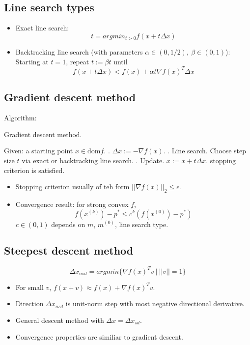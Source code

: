 \subsection{Line search types}
\begin{itemize}
    \item Exact line search: 
    $$
    t = argmin_{t > 0} f(x + t\Delta x)
    $$
    \item Backtracking line search (with parameters $\alpha \in (0, 1/2), \ \beta \in (0, 1)$): \\
    Starting at $t = 1$, repeat $t := \beta t$ until
    $$
    f(x + t\Delta x) < f(x) + \alpha t \nabla f(x)^T\Delta x
    $$
\end{itemize}

\subsection{Gradient descent method}
Algorithm:
\begin{algorithm}[H]
	\caption{Gradient descent method.}
	\begin{algorithmic}[1]
        \State Given: a starting point $x \in \text{dom} f$.
        \Repeat
            . $\Delta x := - \nabla f(x)$. 
            . Line search. Choose step size $t$ via exact or backtracking line search. 
            . Update. $x := x + t\Delta x$.
        \Until stopping criterion is satisfied.
	\end{algorithmic}
\end{algorithm}
\begin{itemize}
    \item Stopping criterion usually of teh form $||\nabla f(x)||_2 \le \epsilon$.
    \item Convergence result: for strong convex $f$,
    $$
    f(x^{(k)}) - p^* \le c^k(f(x^{(0)}) - p^*)
    $$
    $c \in (0, 1)$ depends on $m$, $m^{(0)}$, line search type.
\end{itemize}

\subsection{Steepest descent method}
$$
\Delta x_{nsd} = argmin\{\nabla f(x)^Tv \ | \ ||v|| = 1\}
$$
\begin{itemize}
    \item For small $v$, $f(x + v) \approx f(x) + \nabla f(x)^Tv$.
    \item Direction $\Delta x_{nsd}$ is unit-norm step with most negative directional derivative.
    \item General descent method with $\Delta x = \Delta x_{sd}$.
    \item Convergence properties are similiar to gradient descent.
\end{itemize}

